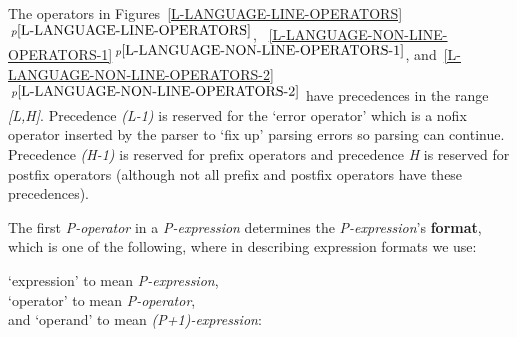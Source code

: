 \documentclass[12pt]{article}
\newcommand{\key}[1]{{\rm \bfseries #1}}
\newcommand{\itemref}[1]{\ref{#1}$\,^{p\pageref{#1}}$}
\begin{document}
The operators in
Figures~\itemref{L-LANGUAGE-LINE-OPERATORS},
~\itemref{L-LANGUAGE-NON-LINE-OPERATORS-1},
and~\itemref{L-LANGUAGE-NON-LINE-OPERATORS-2}
have precedences in
the range {\em [L,H]}.
Precedence {\em (L-1)} is reserved for the `error operator' which is a
nofix operator inserted by the parser to `fix up' parsing errors
so parsing can continue.  Precedence {\em (H-1)} is reserved for prefix
operators and precedence {\em H} is reserved for postfix operators
(although not all prefix and postfix operators have these precedences).

The first {\em P-operator} in a {\em P-expression} determines
the {\em P-expression}'s \key{format}, which is one of the following,
where in describing expression formats we use:
\begin{center}
`expression' to mean {\em P-expression}, \\
`operator' to mean {\em P-operator}, \\
and `operand' to mean {\em (P+1)-expression}:
\end{center}
\end{document}
